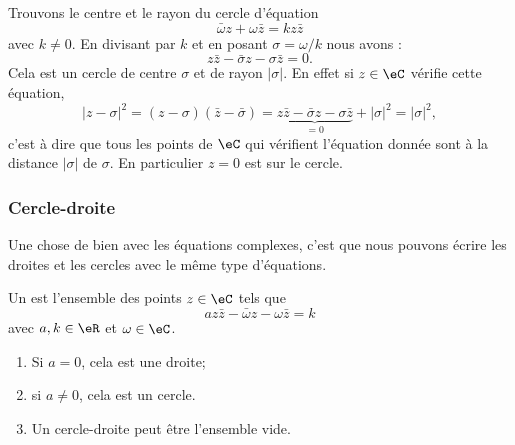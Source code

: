 \begin{example}
    Trouvons le centre et le rayon du cercle d'équation
    \begin{equation}
        \bar\omega z+\omega\bar z=kz\bar z   
    \end{equation}
    avec \( k\neq 0\). En divisant par \( k\) et en posant \( \sigma=\omega/k\) nous avons :
    \begin{equation}
        z\bar z-\bar\sigma z-\sigma\bar z=0.
    \end{equation}
    Cela est un cercle de centre \( \sigma\) et de rayon \( | \sigma |\). En effet si \( z\in \eC\) vérifie cette équation,
    \begin{equation}
        | z-\sigma |^2=(z-\sigma)(\bar z-\bar \sigma)=\underbrace{z\bar z-\bar \sigma z-\sigma \bar z}_{=0}+| \sigma |^2=| \sigma |^2,
    \end{equation}
    c'est à dire que tous les points de \( \eC\) qui vérifient l'équation donnée sont à la distance \( | \sigma |\) de \( \sigma\). En particulier \( z=0\) est sur le cercle.
\end{example}

\subsubsection{Cercle-droite}

Une chose de bien avec les équations complexes, c'est que nous pouvons écrire les droites et les cercles avec le même type d'équations.

\begin{lemmaDef}     \label{LEMooHKHOooHpBuBZ}
    Un  est l'ensemble des points \( z\in \eC\) tels que
    \begin{equation}        \label{EQooUJAKooEVQNqa}
        az\bar z-\bar\omega z-\omega\bar z=k
    \end{equation}
    avec \( a,k\in \eR\) et \( \omega\in \eC\).
    \begin{enumerate}
        \item
            Si \( a=0\), cela est une droite;
        \item
            si \( a\neq 0\), cela est un cercle.
        \item
            Un cercle-droite peut être l'ensemble vide.
    \end{enumerate}
\end{lemmaDef}

